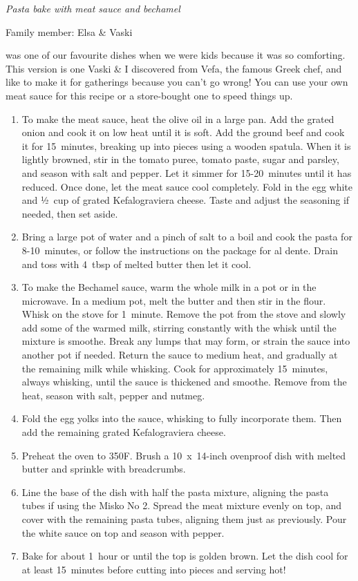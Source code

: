 \textit{Pasta bake with meat sauce and bechamel}

Family member: Elsa \& Vaski

 was one of our favourite dishes when we were kids because it was so comforting. This version is one Vaski \& I discovered from Vefa, the famous Greek chef, and like to make it for gatherings because you can't go wrong! You can use your own meat sauce for this recipe or a store-bought one to speed things up.

\begin{enumerate}
    \item To make the meat sauce, heat the olive oil in a large pan. Add the grated onion and cook it on low heat until it is soft. Add the ground beef and cook it for 15~minutes, breaking up into pieces using a wooden spatula. When it is lightly browned, stir in the tomato puree, tomato paste, sugar and parsley, and season with salt and pepper. Let it simmer for 15-20~minutes until it has reduced. Once done, let the meat sauce cool completely. Fold in the egg white and ½~cup of grated Kefalograviera cheese. Taste and adjust the seasoning if needed, then set aside.
    \item Bring a large pot of water and a pinch of salt to a boil and cook the pasta for 8-10~minutes, or follow the instructions on the package for al dente. Drain and toss with 4~tbsp of melted butter then let it cool.
    \item To make the Bechamel sauce, warm the whole milk in a pot or in the microwave. In a medium pot, melt the butter and then stir in the flour. Whisk on the stove for 1~minute. Remove the pot from the stove and slowly add some of the warmed milk, stirring constantly with the whisk until the mixture is smoothe. Break any lumps that may form, or strain the sauce into another pot if needed. Return the sauce to medium heat, and gradually at the remaining milk while whisking. Cook for approximately 15~minutes, always whisking, until the sauce is thickened and smoothe. Remove from the heat, season with salt, pepper and nutmeg.
    \item Fold the egg yolks into the sauce, whisking to fully incorporate them. Then add the remaining grated Kefalograviera cheese.
    \item Preheat the oven to 350\degree F. Brush a 10~x~14-inch ovenproof dish with melted butter and sprinkle with breadcrumbs.
    \item Line the base of the dish with half the pasta mixture, aligning the pasta tubes if using the Misko No 2. Spread the meat mixture evenly on top, and cover with the remaining pasta tubes, aligning them just as previously. Pour the white sauce on top and season with pepper.
    \item Bake for about 1~hour or until the top is golden brown. Let the dish cool for at least 15~minutes before cutting into pieces and serving hot!
\end{enumerate}

